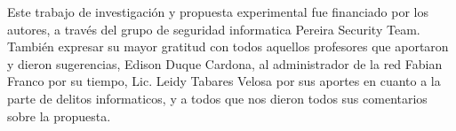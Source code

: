\documentclass[jou,apacite]{apa6}   %
\begin{document}
Este trabajo de investigación y propuesta experimental fue financiado por los autores, a través del grupo de seguridad informatica Pereira Security Team. También expresar su mayor gratitud con todos aquellos profesores que aportaron y dieron sugerencias, Edison Duque Cardona, al administrador de la red Fabian Franco por su tiempo, Lic. Leidy Tabares Velosa por sus aportes en cuanto a la parte de delitos informaticos, y a todos que nos dieron todos sus comentarios sobre la propuesta. 

 

\end{document}
